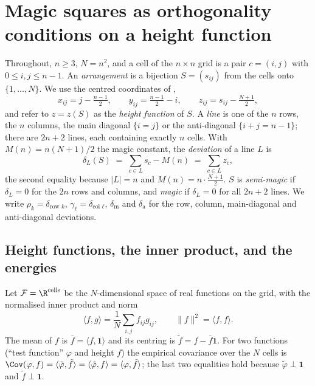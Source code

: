 %

\section{Magic squares as orthogonality conditions on a height function}
\label{sec:theory}

Throughout, $n\ge 3$, $N=n^{2}$, and a cell of the $n\times n$ grid is a pair
$c=(i,j)$ with $0\le i,j\le n-1$.  An \emph{arrangement} is a bijection
$S=(s_{ij})$ from the cells onto $\{1,\dots,N\}$.  We use the centred
coordinates of ,
\[
x_{ij}=j-\tfrac{n-1}{2},\qquad y_{ij}=\tfrac{n-1}{2}-i,\qquad
z_{ij}=s_{ij}-\tfrac{N+1}{2},
\]
and refer to $z=z(S)$ as the \emph{height function} of $S$.
A \emph{line} is one of the $n$ rows, the $n$ columns, the main diagonal
$\{i=j\}$ or the anti-diagonal $\{i+j=n-1\}$; there are $2n+2$ lines, each
containing exactly $n$ cells.  With $M(n)=n(N+1)/2$ the magic constant, the
\emph{deviation} of a line $L$ is
\begin{equation}
\delta_L(S)\;=\;\sum_{c\in L}s_c-M(n)\;=\;\sum_{c\in L}z_c ,
\label{eq:line_dev}
\end{equation}
the second equality because $|L|=n$ and $M(n)=n\cdot\frac{N+1}{2}$.
$S$ is \emph{semi-magic} if $\delta_L=0$ for the $2n$ rows and columns, and
\emph{magic} if $\delta_L=0$ for all $2n+2$ lines.  We write $\rho_k=\delta_{\text{row }k}$,
$\gamma_\ell=\delta_{\text{col }\ell}$, $\delta_{\mathrm{m}}$ and $\delta_{\mathrm{a}}$ for the
row, column, main-diagonal and anti-diagonal deviations.

\subsection{Height functions, the inner product, and the energies}
\label{sec:theory_setup}

Let $\mathcal F=\R^{\text{cells}}$ be the $N$-dimensional space of real
functions on the grid, with the normalised inner product and norm
\begin{equation}
\langle f,g\rangle=\frac1N\sum_{i,j}f_{ij}g_{ij},\qquad \|f\|^{2}=\langle f,f\rangle .
\label{eq:inner}
\end{equation}
The mean of $f$ is $\bar f=\langle f,\mathbf 1\rangle$ and its centring is
$\tilde f=f-\bar f\mathbf 1$.  For two functions (``test function'' $\varphi$ and
height $f$) the empirical covariance over the $N$ cells is
$\Cov(\varphi,f)=\langle\tilde\varphi,\tilde f\rangle=\langle\tilde\varphi,f\rangle=\langle\varphi,\tilde f\rangle$;
the last two equalities hold because $\tilde\varphi\perp\mathbf 1$ and $\tilde f\perp\mathbf 1$.

